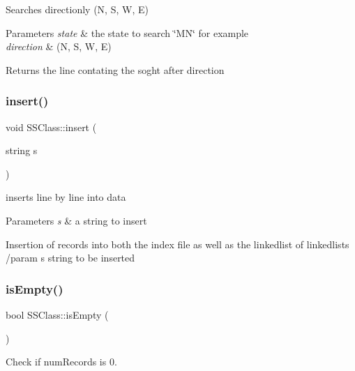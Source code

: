 Searches directionly (N, S, W, E) 


\begin{DoxyParams}{Parameters}
{\em state} & the state to search \char`\"{}\+M\+N\char`\"{} for example \\
\hline
{\em direction} & (N, S, W, E) \\
\hline
\end{DoxyParams}
\begin{DoxyReturn}{Returns}
the line contating the soght after direction 
\end{DoxyReturn}
\mbox{\label{classSSClass_a45c5585c784bf7c4f823f66426664aea}} 
\subsubsection{\texorpdfstring{insert()}{insert()}}
{\footnotesize\ttfamily void S\+S\+Class\+::insert (\begin{DoxyParamCaption}\item[{string}]{s }\end{DoxyParamCaption})}



inserts line by line into data 


\begin{DoxyParams}{Parameters}
{\em s} & a string to insert\\
\hline
\end{DoxyParams}
Insertion of records into both the index file as well as the linkedlist of linkedlists /param s string to be inserted \mbox{\label{classSSClass_afc95611385e4d389818332414d5c491c}} 
\subsubsection{\texorpdfstring{is\+Empty()}{isEmpty()}}
{\footnotesize\ttfamily bool S\+S\+Class\+::is\+Empty (\begin{DoxyParamCaption}{ }\end{DoxyParamCaption})\hspace{0.3cm}{\ttfamily [inline]}}



Check if num\+Records is 0. 

